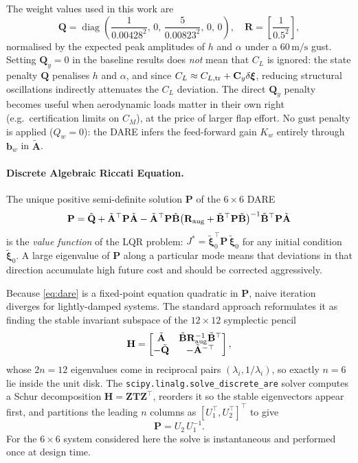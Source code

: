 \documentclass[11pt,a4paper]{article}
\newcommand{\vxi}{\bm{\xi}}
\newcommand{\mA}{\mathbf{A}}
\newcommand{\mB}{\mathbf{B}}
\newcommand{\mC}{\mathbf{C}}
\newcommand{\mP}{\mathbf{P}}
\newcommand{\mQ}{\mathbf{Q}}
\newcommand{\mR}{\mathbf{R}}
\begin{document}
The weight values used in this work are
\begin{equation}
  \mQ = \operatorname{diag}\!\left(\frac{1}{0.00428^2},\,0,\,\frac{5}{0.00823^2},\,0,\,0\right),
  \quad
  \mR = \left[\frac{1}{0.5^2}\right],
  \label{eq:weights}
\end{equation}
normalised by the expected peak amplitudes of $h$ and $\alpha$ under a
$60\,\text{m/s}$ gust.
Setting $\mQ_y = 0$ in the baseline results does \emph{not} mean that $C_L$ is
ignored: the state penalty $\mQ$ penalises $h$ and $\alpha$, and since
$C_L \approx C_{L,\rm tr} + \mC_y\delta\vxi$, reducing structural oscillations
indirectly attenuates the $C_L$ deviation.
The direct $\mQ_y$ penalty becomes useful when aerodynamic loads matter in their
own right (e.g.\ certification limits on $C_M$), at the price of larger flap
effort.
No gust penalty is applied ($Q_w = 0$): the DARE infers the feed-forward gain
$K_w$ entirely through $\mathbf{b}_w$ in $\tilde{\mA}$.

\paragraph{Discrete Algebraic Riccati Equation.}
The unique positive semi-definite solution $\mP$ of the $6\times6$ DARE
\begin{equation}
  \mP = \tilde{\mQ}
        + \tilde{\mA}^\top \mP \tilde{\mA}
        - \tilde{\mA}^\top \mP \tilde{\mB}
          \bigl(\mR_{\rm aug} + \tilde{\mB}^\top \mP \tilde{\mB}\bigr)^{-1}
          \tilde{\mB}^\top \mP \tilde{\mA}
  \label{eq:dare}
\end{equation}
is the \emph{value function} of the LQR problem: $J^* =
\tilde{\vxi}_0^\top \mP\, \tilde{\vxi}_0$ for any initial condition
$\tilde{\vxi}_0$.
A large eigenvalue of $\mP$ along a particular mode means that deviations in
that direction accumulate high future cost and should be corrected aggressively.

Because \eqref{eq:dare} is a fixed-point equation quadratic in $\mP$, naive
iteration diverges for lightly-damped systems.
The standard approach reformulates it as finding the stable invariant subspace
of the $12\times12$ symplectic pencil
\begin{equation}
  \mathbf{H} =
  \begin{bmatrix}
    \tilde{\mA} & \tilde{\mB}\mR_{\rm aug}^{-1}\tilde{\mB}^\top \\
    -\tilde{\mQ} & -\tilde{\mA}^{-\top}
  \end{bmatrix},
  \label{eq:symplectic}
\end{equation}
whose $2n = 12$ eigenvalues come in reciprocal pairs $(\lambda_i, 1/\lambda_i)$,
so exactly $n = 6$ lie inside the unit disk.
The \texttt{scipy.linalg.solve\_discrete\_are} solver computes a Schur
decomposition $\mathbf{H} = \mathbf{Z}\mathbf{T}\mathbf{Z}^\top$, reorders it
so the stable eigenvectors appear first, and partitions the leading $n$ columns
as $[U_1^\top, U_2^\top]^\top$ to give
\begin{equation}
  \mP = U_2\, U_1^{-1}.
  \label{eq:P_schur}
\end{equation}
For the $6\times6$ system considered here the solve is instantaneous and
performed once at design time.
\end{document}
